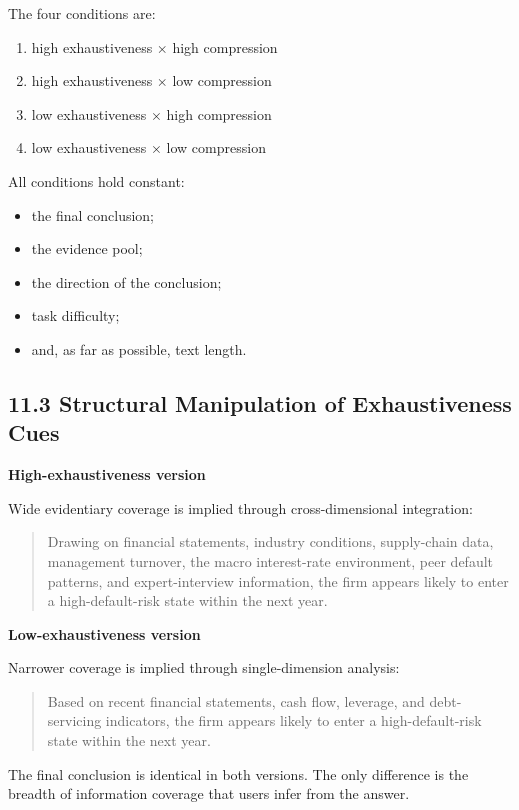 The four conditions are:
\begin{enumerate}[leftmargin=1.8em]
\item high exhaustiveness \(\times\) high compression
\item high exhaustiveness \(\times\) low compression
\item low exhaustiveness \(\times\) high compression
\item low exhaustiveness \(\times\) low compression
\end{enumerate}

All conditions hold constant:
\begin{itemize}[leftmargin=1.5em]
\item the final conclusion;
\item the evidence pool;
\item the direction of the conclusion;
\item task difficulty;
\item and, as far as possible, text length.
\end{itemize}

\subsection*{11.3 Structural Manipulation of Exhaustiveness Cues}

\textbf{High-exhaustiveness version}

Wide evidentiary coverage is implied through cross-dimensional integration:
\begin{quote}
Drawing on financial statements, industry conditions, supply-chain data, management turnover, the macro interest-rate environment, peer default patterns, and expert-interview information, the firm appears likely to enter a high-default-risk state within the next year.
\end{quote}

\textbf{Low-exhaustiveness version}

Narrower coverage is implied through single-dimension analysis:
\begin{quote}
Based on recent financial statements, cash flow, leverage, and debt-servicing indicators, the firm appears likely to enter a high-default-risk state within the next year.
\end{quote}

The final conclusion is identical in both versions. The only difference is the breadth of information coverage that users infer from the answer.


